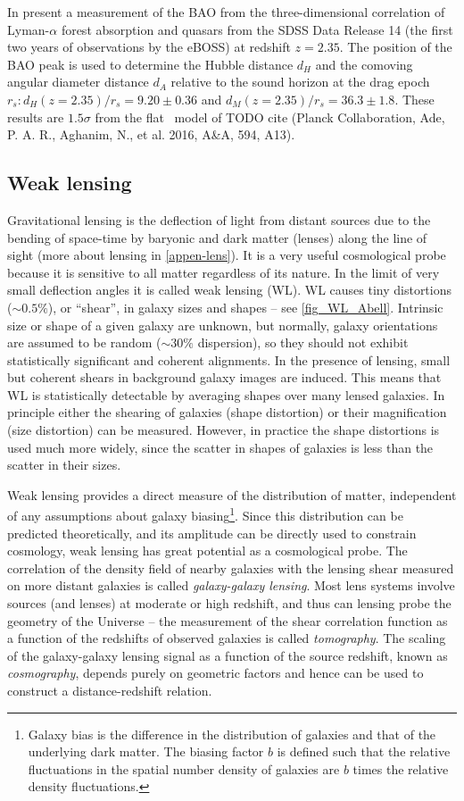 In \textcite{BAO_results} present a measurement of the BAO from the three-dimensional correlation of Lyman-$\alpha$ forest absorption and quasars from the SDSS Data Release 14 (the first two years of observations by the eBOSS) at redshift $z=2.35$. The position of the BAO peak is used to determine the Hubble distance $d_H$ and the comoving angular diameter distance $d_A$ relative to the sound horizon at the drag epoch $r_s: d_H(z=2.35)/r_s = 9.20\pm0.36$ and $d_M(z=2.35)/r_s = 36.3\pm1.8$. These results are $1.5\sigma$ from the flat \LCDM\ model of TODO cite ({Planck Collaboration, Ade, P. A. R., Aghanim, N., et al. 2016, A\&A, 594, A13}).
\subsection{Weak lensing}
Gravitational lensing is the deflection of light from distant sources due to the bending of space-time by baryonic and dark matter (lenses) along the line of sight (more about lensing in \autoref{appen-lens}). It is a very useful cosmological probe because it is sensitive to all matter regardless of its nature. In the limit of very small deflection angles it is called weak lensing (WL). WL causes tiny distortions ($\sim0.5\%$), or ``shear'', in galaxy sizes and shapes -- see \autoref{fig_WL_Abell}. Intrinsic size or shape of a given galaxy are unknown, but normally, galaxy orientations are assumed to be random ($\sim30\%$ dispersion), so they should not exhibit statistically significant and coherent alignments. In the presence of lensing, small but coherent shears in background galaxy images are induced. This means that WL is statistically detectable by averaging shapes over many lensed galaxies. In principle either the shearing of galaxies (shape distortion) or their magnification (size distortion) can be measured. However, in practice the shape distortions is used much more widely, since the scatter in shapes of galaxies is less than the scatter in their sizes.

Weak lensing provides a direct measure of the distribution of matter, independent of any assumptions about galaxy biasing\footnote{Galaxy bias is the difference in the distribution of galaxies and that of the underlying dark matter. The biasing factor $b$ is defined such that the relative fluctuations in the spatial number density of galaxies are $b$ times the relative density fluctuations.}. Since this distribution can be predicted theoretically, and its amplitude can be directly used to constrain cosmology, weak lensing has great potential as a cosmological probe. The correlation of the density field of nearby galaxies with the lensing shear measured on more distant galaxies is called \textit{galaxy-galaxy lensing}. Most lens systems involve sources (and lenses) at moderate or high redshift, and thus can lensing probe the geometry of the Universe -- the measurement of the shear correlation function as a function of the redshifts of observed galaxies is called \textit{tomography}. The scaling of the galaxy-galaxy lensing signal as a function of the source redshift, known as \textit{cosmography}, depends purely on geometric factors and hence can be used to construct a distance-redshift relation.

